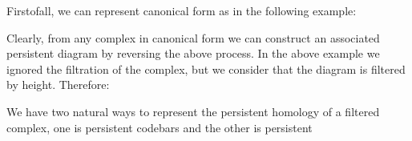 
Firstofall, we can represent canonical form as in the following example:



Clearly, from any complex in canonical form we can construct an associated persistent diagram by reversing the above process.
In the above example we ignored the filtration of the complex, but we consider that the diagram is filtered by height.
 Therefore:

%
%



%


We have two natural ways to represent the persistent homology of a 
filtered complex, one is persistent codebars and the other is persistent 

